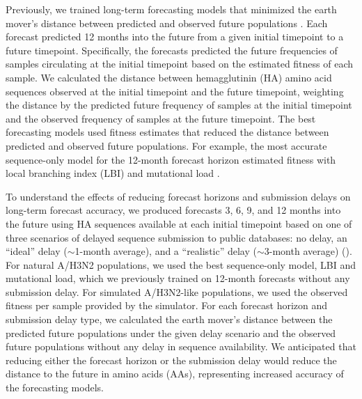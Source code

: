 \documentclass[9pt,lineno]{elife}
\begin{document}
Previously, we trained long-term forecasting models that minimized the earth mover's distance \citep{Rubner1998} between predicted and observed future populations \citep{Huddleston2020}.
Each forecast predicted 12 months into the future from a given initial timepoint to a future timepoint.
Specifically, the forecasts predicted the future frequencies of samples circulating at the initial timepoint based on the estimated fitness of each sample.
We calculated the distance between hemagglutinin (HA) amino acid sequences observed at the initial timepoint and the future timepoint, weighting the distance by the predicted future frequency of samples at the initial timepoint and the observed frequency of samples at the future timepoint.
The best forecasting models used fitness estimates that reduced the distance between predicted and observed future populations.
For example, the most accurate sequence-only model for the 12-month forecast horizon estimated fitness with local branching index (LBI) \citep{Neher:2014eu} and mutational load \citep{Luksza:2014hj}.

To understand the effects of reducing forecast horizons and submission delays on long-term forecast accuracy, we produced forecasts 3, 6, 9, and 12 months into the future using HA sequences available at each initial timepoint based on one of three scenarios of delayed sequence submission to public databases: no delay, an ``ideal'' delay ($\sim$1-month average), and a ``realistic'' delay ($\sim$3-month average) ().
For natural A/H3N2 populations, we used the best sequence-only model, LBI and mutational load, which we previously trained on 12-month forecasts without any submission delay.
For simulated A/H3N2-like populations, we used the observed fitness per sample provided by the simulator.
For each forecast horizon and submission delay type, we calculated the earth mover's distance between the predicted future populations under the given delay scenario and the observed future populations without any delay in sequence availability.
We anticipated that reducing either the forecast horizon or the submission delay would reduce the distance to the future in amino acids (AAs), representing increased accuracy of the forecasting models.
\end{document}
